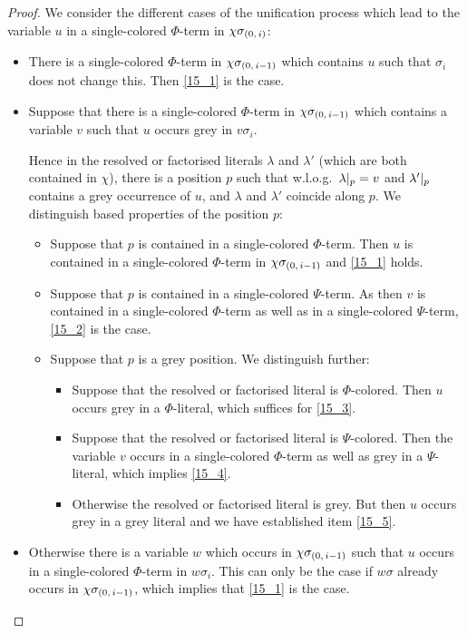 \documentclass[,%
	draft=false,%
	numbers=noendperiod
	12pt,
	a4paper,
	oneside,%
	openany,
]{memoir}
\newcommand{\inv}{\ensuremath{\chi}}
\begin{document}
\begin{proof}
	We consider the different cases of the unification process which lead to the variable $u$ in a single-colored $\Phi$-term in $\inv\sigmazi$:

	\begin{itemize}
		\item There is a single-colored $\Phi$-term in $\inv\sigmazmi$ which contains $u$ such that $\sigma_i$ does not change this.
			Then \ref{15_1} is the case.


		\item Suppose that there is a single-colored $\Phi$-term in $\inv\sigmazmi$ which contains a variable $v$ such that $u$ occurs grey in $v\sigma_i$.

			Hence in the resolved or factorised literals $\lambda$ and $\lambda'$ (which are both contained in $\inv$), there is a position $p$ such that w.l.o.g.\ $\lambda|_{p} = v$ and $\lambda'|_{p}$ contains a grey occurrence of $u$, and $\lambda$ and $\lambda'$ coincide along $p$.
			We distinguish based properties of the position $p$:

			\begin{itemize}
				\item Suppose that $p$ is contained in a single-colored $\Phi$-term.
					Then $u$ is contained in a single-colored $\Phi$-term in $\inv\sigmazmi$ and \ref{15_1} holds.

				\item Suppose that $p$ is contained in a single-colored $\Psi$-term.
					As then $v$ is contained in a single-colored $\Phi$-term as well as in a single-colored $\Psi$-term, \ref{15_2} is the case.

				\item Suppose that $p$ is a grey position.
					We distinguish further:

					\begin{itemize}
						\item Suppose that the resolved or factorised literal is $\Phi$-colored.
							Then $u$ occurs grey in a $\Phi$-literal, which suffices for \ref{15_3}. 

						\item Suppose that the resolved or factorised literal is $\Psi$-colored.
							Then the variable $v$ occurs in a single-colored $\Phi$-term as well as grey in a $\Psi$-literal, which implies \ref{15_4}.

						\item
							Otherwise the resolved or factorised literal is grey. 
							But then $u$ occurs grey in a grey literal and we have established item \ref{15_5}.
					\end{itemize}


			\end{itemize}
		\item Otherwise there is a variable $w$ which occurs in $\inv\sigmazmi$ such that $u$ occurs in a single-colored $\Phi$-term in $w\sigma_i$.
			This can only be the case if $w\sigma$ already occurs in $\inv\sigmazmi$, which implies that \ref{15_1} is the case.
			\qedhere
	\end{itemize}

\end{proof}
\end{document}
